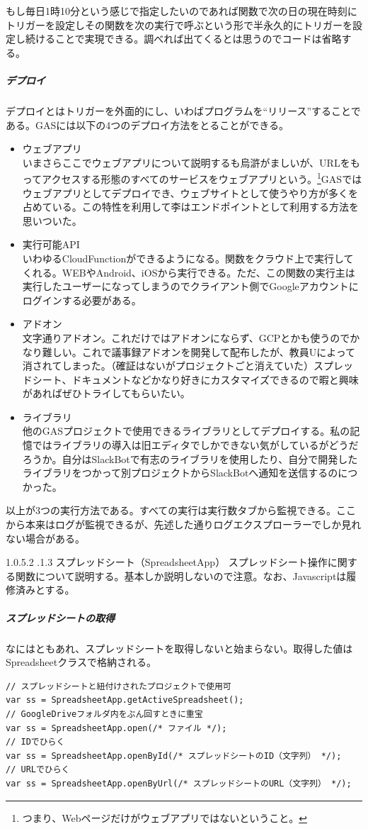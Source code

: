 \documentclass[dvipdfmx,jb5]{jarticle}
\makeatletter
\newcommand{\subsubsubsection}{\@startsection{paragraph}{4}{\z@}%
    {1.0\Cvs \@plus.5\Cdp \@minus.2\Cdp}%
    {.1\Cvs \@plus.3\Cdp}%
    {\large \bfseries}
  }
\makeatother
\begin{document}
もし毎日1時10分という感じで指定したいのであれば関数で次の日の現在時刻にトリガーを設定しその関数を次の実行で呼ぶという形で半永久的にトリガーを設定し続けることで実現できる。調べれば出てくるとは思うのでコードは省略する。

\subparagraph{デプロイ}
デプロイとはトリガーを外面的にし、いわばプログラムを``リリース''することである。GASには以下の4つのデプロイ方法をとることができる。
\begin{itemize}
\item ウェブアプリ\\
いまさらここでウェブアプリについて説明するも烏滸がましいが、URLをもってアクセスする形態のすべてのサービスをウェブアプリという。\footnote{つまり、Webページだけがウェブアプリではないということ。}GASではウェブアプリとしてデプロイでき、ウェブサイトとして使うやり方が多くを占めている。この特性を利用して李はエンドポイントとして利用する方法を思いついた。
\item 実行可能API\\
いわゆるCloudFunctionができるようになる。関数をクラウド上で実行してくれる。WEBやAndroid、iOSから実行できる。ただ、この関数の実行主は実行したユーザーになってしまうのでクライアント側でGoogleアカウントにログインする必要がある。
\item アドオン\\
文字通りアドオン。これだけではアドオンにならず、GCPとかも使うのでかなり難しい。これで議事録アドオンを開発して配布したが、教員Uによって消されてしまった。（確証はないがプロジェクトごと消えていた）スプレッドシート、ドキュメントなどかなり好きにカスタマイズできるので暇と興味があればぜひトライしてもらいたい。
\item ライブラリ\\
他のGASプロジェクトで使用できるライブラリとしてデプロイする。私の記憶ではライブラリの導入は旧エディタでしかできない気がしているがどうだろうか。自分はSlackBotで有志のライブラリを使用したり、自分で開発したライブラリをつかって別プロジェクトからSlackBotへ通知を送信するのにつかった。
\end{itemize}

以上が3つの実行方法である。すべての実行は実行数タブから監視できる。ここから本来はログが監視できるが、先述した通りログエクスプローラーでしか見れない場合がある。

\subsubsubsection{スプレッドシート（SpreadsheetApp）}
スプレッドシート操作に関する関数について説明する。基本しか説明しないので注意。なお、Javascriptは履修済みとする。

\subparagraph{スプレッドシートの取得}
なにはともあれ、スプレッドシートを取得しないと始まらない。取得した値はSpreadsheetクラスで格納される。
\lstset{language=JavaScript}
\begin{lstlisting}
// スプレッドシートと紐付けされたプロジェクトで使用可
var ss = SpreadsheetApp.getActiveSpreadsheet();
// GoogleDriveフォルダ内をぶん回すときに重宝
var ss = SpreadsheetApp.open(/* ファイル */);
// IDでひらく
var ss = SpreadsheetApp.openById(/* スプレッドシートのID（文字列） */);
// URLでひらく
var ss = SpreadsheetApp.openByUrl(/* スプレッドシートのURL（文字列） */);
\end{lstlisting}
\end{document}
